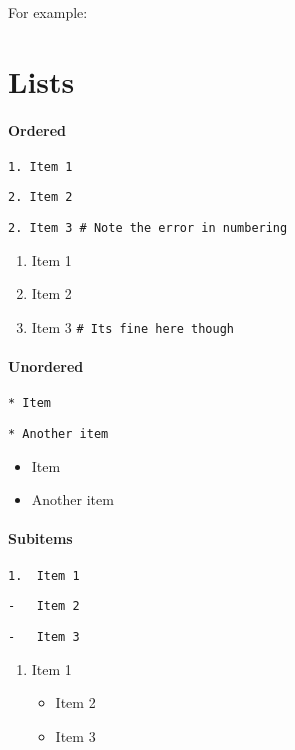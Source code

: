 \documentclass[
  letterpaper,
  DIV=11,
  numbers=noendperiod]{scrartcl}
\let\oldparagraph\paragraph
\renewcommand{\paragraph}[1]{\oldparagraph{#1}\mbox{}}
\providecommand{\tightlist}{%
  \setlength{\itemsep}{0pt}\setlength{\parskip}{0pt}}\usepackage{longtable,booktabs,array}
\begin{document}
For example:

\hypertarget{lists}{%
\section{Lists}\label{lists}}

\hypertarget{ordered}{%
\paragraph{Ordered}\label{ordered}}

\texttt{1.\ Item\ 1}

\texttt{2.\ Item\ 2}

\texttt{2.\ Item\ 3\ \#\ Note\ the\ error\ in\ numbering}

\begin{enumerate}
\def\labelenumi{\arabic{enumi}.}
\item
  Item 1
\item
  Item 2
\item
  Item 3 \texttt{\#\ It\textquotesingle{}s\ fine\ here\ though}
\end{enumerate}

\hypertarget{unordered}{%
\paragraph{Unordered}\label{unordered}}

\texttt{*\ Item}

\texttt{*\ Another\ item}

\begin{itemize}
\item
  Item
\item
  Another item
\end{itemize}

\hypertarget{subitems}{%
\paragraph{Subitems}\label{subitems}}

\texttt{1.\ \ Item\ 1}

\texttt{-\ \ \ Item\ 2}

\texttt{-\ \ \ Item\ 3}

\begin{enumerate}
\def\labelenumi{\arabic{enumi}.}
\tightlist
\item
  Item 1

  \begin{itemize}
  \tightlist
  \item
    Item 2
  \item
    Item 3
  \end{itemize}
\end{enumerate}
\end{document}
